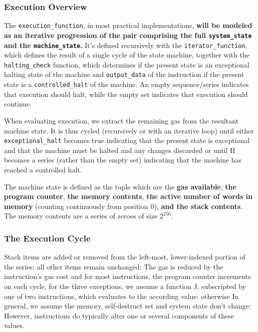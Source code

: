 \documentclass[10pt,a4paper,leqno,bibliography=totoc]{scrartcl}
\newenvironment{alphafootnotes}
{\par\edef\savedfootnotenumber{\number\value{footnote}}
\renewcommand{\thefootnote}{\alph{footnote}}
\setcounter{footnote}{0}}
{\par\setcounter{footnote}{\savedfootnotenumber}}
\begin{document}
\begin{alphafootnotes}
\begin{multicols*}{2}
				\subsubsection{Execution Overview} The \texttt{execution\_function}, in most practical implementations, \textbf{will be modeled as an iterative progression of the pair comprising the full \texttt{system\_state} and the \texttt{machine\_state}.} It's defined recursively with the \texttt{iterator\_function}, which defines the result of a single cycle of the state machine, together with the \texttt{halting\_check} function, which determines if the present state is an exceptional halting state of the machine and \texttt{output\_data} of the instruction if the present state is a \texttt{controlled\_halt} of the machine. An empty sequence/series indicates that execution should halt, while the empty set indicates that execution should continue.


				When evaluating execution, we extract the remaining gas from the resultant machine state. It is thus cycled (recursively or with an iterative loop) until either \texttt{exceptional\_halt} becomes true indicating that the present state is exceptional and that the machine must be halted and any changes discarded or until H becomes a series (rather than the empty set) indicating that the machine has reached a controlled halt. 
					
				The machine state  is defined as the tuple which are the \textbf{gas available}, \textbf{the program counter}, \textbf{the memory contents}, \textbf{the active number of words in memory} (counting continuously from position 0), \textbf{and the stack contents}. The memory contents are a series of zeroes of size $2^{256}$.\supercite{Wood2017}
				
				\subsubsection{The Execution Cycle} Stack items are added or removed from the left-most, lower-indexed portion of the series; all other items remain unchanged:  The gas is reduced by the instruction’s gas cost and for most instructions, the program counter increments on each cycle, for the three exceptions, we assume a function J, subscripted by one of two instructions, which evaluates to the according value: otherwise In general, we assume the memory, self-destruct set and system state don’t change: However, instructions do typically alter one or several components of these values. 
				

\end{multicols*}
\end{alphafootnotes}
\end{document}
